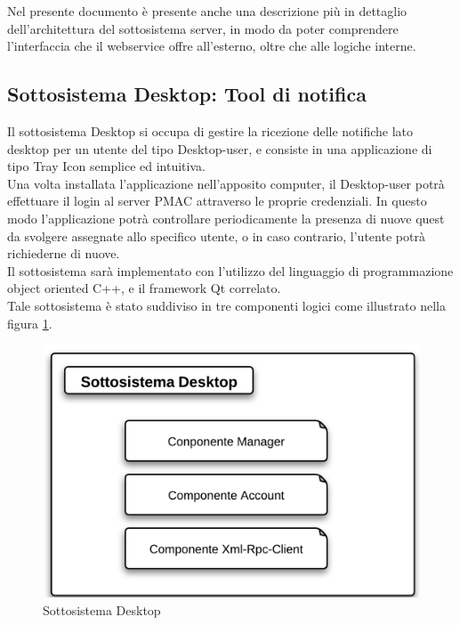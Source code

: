 Nel presente documento è presente anche una descrizione più in dettaglio dell'architettura del sottosistema server, in modo da poter comprendere l'interfaccia che il webservice offre all'esterno, oltre che alle logiche interne.


\subsection{Sottosistema Desktop: Tool di notifica}

Il sottosistema Desktop si occupa di gestire la ricezione delle notifiche lato desktop per un utente del tipo Desktop-user, e consiste in una applicazione di tipo Tray Icon semplice ed intuitiva.\\
Una volta installata l'applicazione nell'apposito computer, il Desktop-user potrà effettuare il login al server PMAC attraverso le proprie credenziali. In questo modo l'applicazione potrà controllare periodicamente la presenza di nuove quest da svolgere assegnate allo specifico utente, o in caso contrario, l'utente potrà richiederne di nuove.\\
Il sottosistema sarà implementato con l'utilizzo del linguaggio di programmazione object oriented C++, e il framework Qt correlato.\\
Tale sottosistema è stato suddiviso in tre componenti logici come illustrato nella figura \ref{Sottosistema Desktop}.


\begin{figure}[H]
\centering
\includegraphics[scale=0.7]{images/Desktop/sottosistemaDesktop.png} %
\caption{Sottosistema Desktop}
\label{Sottosistema Desktop}
\end{figure}



